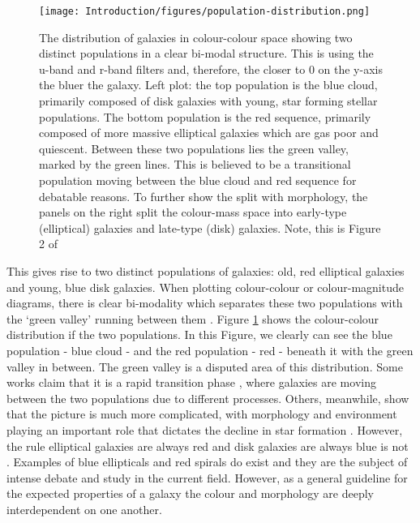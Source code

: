 \begin{figure}
\centering
\texttt{[image: Introduction/figures/population-distribution.png]}
\caption[The distribution of galaxies in colour-colour space showing two distinct populations in a clear bi-modal structure.]{The distribution of galaxies in colour-colour space showing two distinct populations in a clear bi-modal structure. This is using the u-band and r-band filters and, therefore, the closer to 0 on the y-axis the bluer the galaxy. Left plot: the top population is the blue cloud, primarily composed of disk galaxies with young, star forming stellar populations. The bottom population is the red sequence, primarily composed of more massive elliptical galaxies which are gas poor and quiescent. Between these two populations lies the green valley, marked by the green lines. This is believed to be a transitional population moving between the blue cloud and red sequence for debatable reasons. To further show the split with morphology, the panels on the right split the colour-mass space into early-type (elliptical) galaxies and late-type (disk) galaxies. Note, this is Figure 2 of \citet{2014MNRAS.440..889S}}
\label{fig:blue-red-population}
\end{figure}

This gives rise to two distinct populations of galaxies: old, red elliptical galaxies and young, blue disk galaxies. When plotting colour-colour or colour-magnitude diagrams, there is clear bi-modality which separates these two populations with the `green valley' running between them \citep{2001AJ....122.1861S}. Figure \ref{fig:blue-red-population} shows the colour-colour distribution if the two populations. In this Figure, we clearly can see the blue population - blue cloud - and the red population - red \DIFdelbegin {}\DIFdelend \DIFaddbegin {}\DIFaddend - beneath it with the green valley in between. The green valley is a disputed area of this distribution. Some works claim that it is a rapid transition phase \citep{2007ApJS..173..315S, 2015MNRAS.450..435S}, where galaxies are moving between the two populations due to different processes. Others, meanwhile, show that the picture is much more complicated, with morphology and environment playing an important role that dictates the decline in star formation \citep{2014MNRAS.440..889S}. However, \DIFdelbegin {}\DIFdelend the rule elliptical galaxies are always red and disk galaxies are always blue is not \DIFdelbegin {}\DIFdelend \DIFaddbegin {}\DIFaddend \citep{2022MNRAS.510.4126S}. Examples of blue ellipticals and red spirals do exist \citep{2009MNRAS.396..818S, 2010MNRAS.405..783M, 2022AJ....163..150K} and they are the subject of intense debate and study in the current field. However, as a general guideline for the expected properties of a galaxy the colour and morphology are deeply interdependent on one another.

